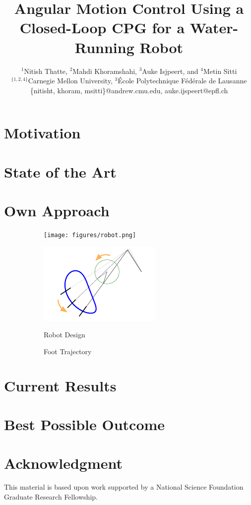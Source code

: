 \documentclass[letterpaper,twocolumn]{article}
\title{\large \textbf{Angular Motion Control Using a Closed-Loop CPG for a Water-Running Robot}}
\author{\small ${^1}$Nitish Thatte, ${^2}$Mahdi Khoramshahi, ${^3}$Auke Isjpeert, and  ${^4}$Metin Sitti \\
        \small $^{\{1,2,4\}}$Carnegie Mellon University, $^{3}$\'{E}cole Polytechnique F\'{e}d\'{e}rale de Lausanne\\
        \small \{nitisht, khoram, msitti\}@andrew.cmu.edu, auke.ijspeert@epfl.ch
}
\date{}
\begin{document}
\maketitle
\section{Motivation}


\section{State of the Art}


\section{Own Approach}


\begin{figure}[tb]
	\centering
	\begin{subfigure}[c]{0.24\textwidth}
		\centering
		\texttt{[image: figures/robot.png]}
	\end{subfigure}
	\begin{subfigure}[c]{0.24\textwidth}
		\centering
		\includegraphics[width = \textwidth]{figures/traj.pdf}
	\end{subfigure}

	\begin{subfigure}[c]{0.24\textwidth}
		\caption{Robot Design}
		\label{fig:robot}
	\end{subfigure}
	\begin{subfigure}[c]{0.24\textwidth}
		\caption{Foot Trajectory}
		\label{fig:traj}
	\end{subfigure}
	\vspace{-0.15in}
	\caption{}
	\vspace{-0.10in}
\end{figure}

\section{Current Results}


\section{Best Possible Outcome}


\section*{Acknowledgment}
This material is based upon work supported by a National Science Foundation Graduate Research Fellowship. 



\end{document}

